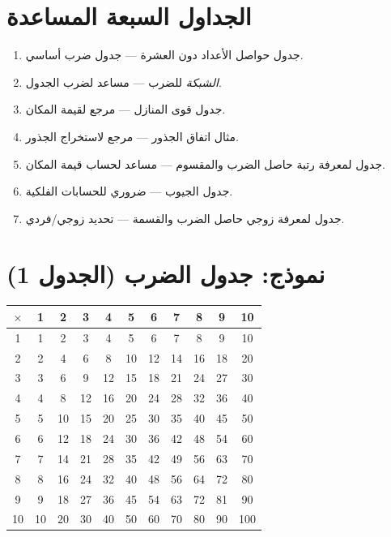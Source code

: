 \documentclass[11pt,a4paper,openany,oneside]{book}
\newcommand{\ar}[1]{{\arabicfont\beginR #1\endR}}
\begin{document}
\section{\ar{الجداول السبعة المساعدة}}

\begin{enumerate}[label=\textbf{\ar{جدول} \arabic*:}]
  \item \ar{جدول حواصل الأعداد دون العشرة — جدول ضرب أساسي.}
  \item \ar{\textit{الشبكة} للضرب — مساعد لضرب الجدول.}
  \item \ar{جدول قوى المنازل — مرجع لقيمة المكان.}
  \item \ar{مثال اتفاق الجذور — مرجع لاستخراج الجذور.}
  \item \ar{جدول لمعرفة رتبة حاصل الضرب والمقسوم — مساعد لحساب قيمة المكان.}
  \item \ar{جدول الجيوب — ضروري للحسابات الفلكية.}
  \item \ar{جدول لمعرفة زوجي حاصل الضرب والقسمة — تحديد زوجي/فردي.}
\end{enumerate}

\section{\ar{نموذج: جدول الضرب (الجدول 1)}}

\begin{center}
\begin{tabular}{|c|cccccccccc|}
\hline
$\times$ & 1 & 2 & 3 & 4 & 5 & 6 & 7 & 8 & 9 & 10 \\
\hline
1 & 1 & 2 & 3 & 4 & 5 & 6 & 7 & 8 & 9 & 10 \\
2 & 2 & 4 & 6 & 8 & 10 & 12 & 14 & 16 & 18 & 20 \\
3 & 3 & 6 & 9 & 12 & 15 & 18 & 21 & 24 & 27 & 30 \\
4 & 4 & 8 & 12 & 16 & 20 & 24 & 28 & 32 & 36 & 40 \\
5 & 5 & 10 & 15 & 20 & 25 & 30 & 35 & 40 & 45 & 50 \\
6 & 6 & 12 & 18 & 24 & 30 & 36 & 42 & 48 & 54 & 60 \\
7 & 7 & 14 & 21 & 28 & 35 & 42 & 49 & 56 & 63 & 70 \\
8 & 8 & 16 & 24 & 32 & 40 & 48 & 56 & 64 & 72 & 80 \\
9 & 9 & 18 & 27 & 36 & 45 & 54 & 63 & 72 & 81 & 90 \\
10 & 10 & 20 & 30 & 40 & 50 & 60 & 70 & 80 & 90 & 100 \\
\hline
\end{tabular}
\end{center}
\clearpage
\end{document}
